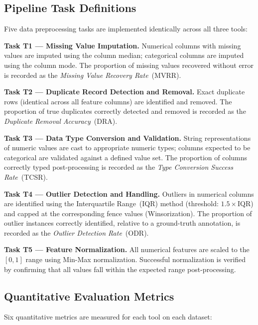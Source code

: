 \documentclass[journal]{IEEEtran}
\begin{document}
\subsection{Pipeline Task Definitions}

Five data preprocessing tasks are implemented identically across all three
tools:

\textbf{Task T1 --- Missing Value Imputation.} Numerical columns with
missing values are imputed using the column median; categorical columns
are imputed using the column mode. The proportion of missing values
recovered without error is recorded as the \textit{Missing Value Recovery
Rate}~(MVRR).

\textbf{Task T2 --- Duplicate Record Detection and Removal.} Exact
duplicate rows (identical across all feature columns) are identified and
removed. The proportion of true duplicates correctly detected and removed
is recorded as the \textit{Duplicate Removal Accuracy}~(DRA).

\textbf{Task T3 --- Data Type Conversion and Validation.} String
representations of numeric values are cast to appropriate numeric types;
columns expected to be categorical are validated against a defined value
set. The proportion of columns correctly typed post-processing is
recorded as the \textit{Type Conversion Success Rate}~(TCSR).

\textbf{Task T4 --- Outlier Detection and Handling.} Outliers in
numerical columns are identified using the Interquartile Range~(IQR)
method (threshold: $1.5 \times \text{IQR}$) and capped at the
corresponding fence values (Winsorization). The proportion of outlier
instances correctly identified, relative to a ground-truth annotation, is
recorded as the \textit{Outlier Detection Rate}~(ODR).

\textbf{Task T5 --- Feature Normalization.} All numerical features are
scaled to the $[0, 1]$ range using Min-Max normalization. Successful
normalization is verified by confirming that all values fall within the
expected range post-processing.

\subsection{Quantitative Evaluation Metrics}

Six quantitative metrics are measured for each tool on each dataset:
\end{document}

